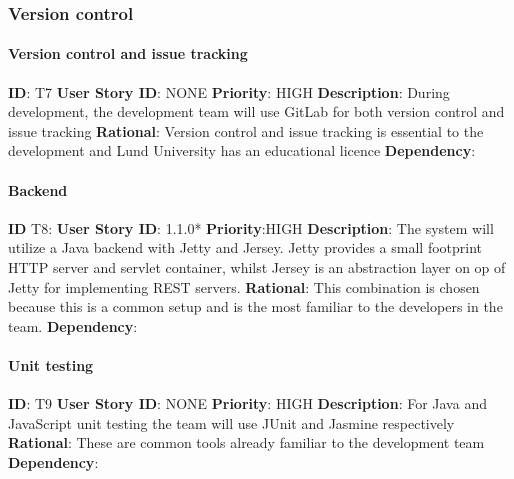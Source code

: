 \documentclass{article}
\begin{document}
\subsubsection{Version control}
\paragraph{Version control and issue tracking}\label{req:}
\textbf{ID}: T7\newline
\textbf{User Story ID}: NONE \newline
\textbf{Priority}: HIGH\newline
\textbf{Description}: During development, the development team will use GitLab for both version control and issue tracking\newline
\textbf{Rational}: Version control and issue tracking is essential to the development and Lund University has an educational licence\newline
\textbf{Dependency}: \newline

\paragraph{Backend}\label{req:}
\textbf{ID} T8: \newline
\textbf{User Story ID}: 1.1.0* \newline
\textbf{Priority}:HIGH \newline
\textbf{Description}: The system will utilize a Java backend with Jetty and Jersey. Jetty provides a small footprint HTTP server and servlet container, whilst Jersey is an abstraction layer on op of Jetty for implementing REST servers. \newline
\textbf{Rational}: This combination is chosen because this is a common setup and is the most familiar to the developers in the team.\newline
\textbf{Dependency}: \newline

\paragraph{Unit testing}\label{req:}
\textbf{ID}: T9\newline
\textbf{User Story ID}: NONE\newline
\textbf{Priority}: HIGH\newline
\textbf{Description}: For Java and JavaScript unit testing the team will use JUnit and Jasmine respectively \newline
\textbf{Rational}: These are common tools already familiar to the development team\newline
\textbf{Dependency}: \newline
\end{document}
